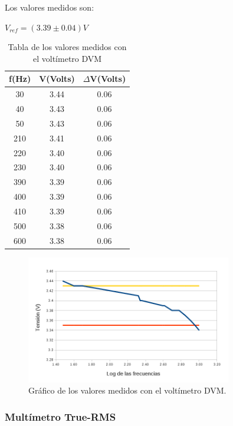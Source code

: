 \documentclass{article}
\begin{document}
Los valores medidos son:

\begin{center}
$V_{ref} = (3.39 \pm 0.04) V$
\end{center}

\begin{table}[!hbt]
	\begin{center}
	\begin{tabular}{|c|c|c|}\hline
	\textbf{f(Hz)} & \textbf{V(Volts)} & \textbf{$\Delta$V(Volts)} \\ \hline

	30 & 3.44 &  0.06	\\ \hline
    40 & 3.43 &	0.06\\ \hline
    50 & 3.43 &	0.06\\ \hline
	210 & 3.41 & 0.06\\ \hline
	220 & 3.40 & 0.06\\ \hline
	230 & 3.40 & 0.06\\ \hline
	390 & 3.39 & 0.06\\ \hline
	400 & 3.39 & 0.06\\ \hline
	410 & 3.39 & 0.06\\	 \hline
	500 & 3.38 & 0.06\\ \hline
	600 & 3.38 & 0.06\\ \hline
	\end{tabular}
	\caption{Tabla de los valores medidos con el voltímetro DVM}
	\end{center}
\end{table}
\bigskip


\begin{figure}[h!tbp]
\centering
\includegraphics[width=0.80\textwidth]{images/tablaDVM.png}
\caption{Gráfico de los valores medidos con el voltímetro DVM.}
\end{figure}



\subsubsection{Multímetro True-RMS}
\end{document}
